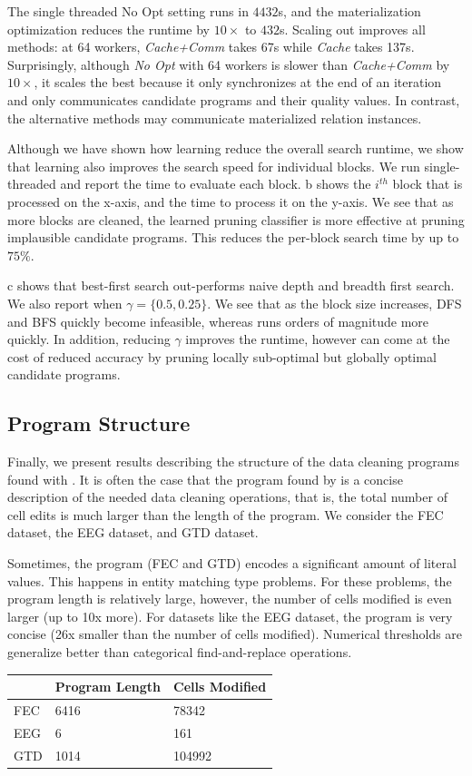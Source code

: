 The single threaded No Opt setting runs in $4432$s, and the materialization optimization reduces the runtime by $10\times$ to $432$s.   Scaling out improves all methods: at 64 workers, {\it Cache+Comm} takes 67s while {\it Cache} takes 137s.  Surprisingly, although {\it No Opt} with 64 workers is slower than {\it Cache+Comm} by $10\times$, it scales the best because it only synchronizes at the end of an iteration and only communicates candidate programs and their quality values.  In contrast, the alternative methods may communicate materialized relation instances.  

 Although we have shown how learning reduce the overall search runtime, we show that learning also improves the search speed for individual blocks.  We run single-threaded \sys and report the time to evaluate each block.  b shows the $i^{th}$ block that is processed on the x-axis, and the time to process it on the y-axis.   We see that as more blocks are cleaned, the learned pruning classifier is more effective at pruning implausible candidate programs.  This reduces the per-block search time by up to $75\%$.  

 c shows that best-first search out-performs naive depth and breadth first search.  We also report \sys when $\gamma=\{0.5, 0.25\}$.  We see that as the block size increases, DFS and BFS quickly become infeasible, whereas \sys runs orders of magnitude more quickly.  In addition, reducing $\gamma$ improves the runtime, however can come at the cost of reduced accuracy by pruning locally sub-optimal but globally optimal candidate programs.  



\subsection*{Program Structure}
Finally, we present results describing the structure of the data cleaning programs found with \sys.
It is often the case that the program found by \sys is a concise description of the needed data cleaning operations, that is, the total number of cell edits is much larger than the length of the program.
We consider the FEC dataset, the EEG dataset, and GTD dataset.

Sometimes, the program (FEC and GTD) encodes a significant amount of literal values. This happens in entity matching type problems. For these problems, the program length is relatively large, however, the number of cells modified is even larger (up to 10x more).
For datasets like the EEG dataset, the program is very concise (26x smaller than the number of cells modified).
Numerical thresholds are generalize better than categorical find-and-replace operations.

\begin{table}[ht!]
\centering
\label{my-label}
\begin{tabular}{|l|l|l|}
\hline
    & Program Length & Cells Modified \\ \hline \hline
FEC & 6416           & 78342          \\ \hline
EEG & 6              & 161            \\ \hline
GTD & 1014           & 104992 \\ \hline
\end{tabular}
\end{table}


